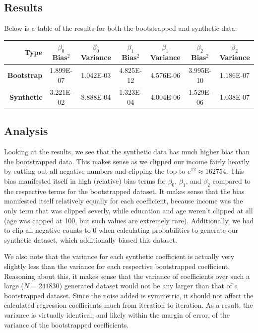 \documentclass[12pt]{article}
\begin{document}
\subsection{Results}

\noindent

Below is a table of the results for both the bootstrapped and synthetic data:

\begin{table}[h]
\begin{tabular}{|r|c|c|c|c|c|c|}
\hline
{\textbf{Type}} & $\beta_0$ Bias$^2$ & $\beta_0$ Variance & $\beta_1$ Bias$^2$ & $\beta_1$ Variance & $\beta_2$ Bias$^2$ & $\beta_2$ Variance \\ \hline
\textbf{Bootstrap} & 1.899E-07  & 1.042E-03 & 4.825E-12 & 4.576E-06 & 3.995E-10 & 1.186E-07 \\ \hline
\textbf{Synthetic} & 3.221E-02 & 8.888E-04 & 1.323E-04 & 4.004E-06 & 1.529E-06 & 1.038E-07 \\ \hline
\end{tabular}
\end{table}

\subsection{Analysis}

\noindent

Looking at the results, we see that the synthetic data has much higher bias than the bootstrapped data. This makes sense as we clipped our income fairly heavily by cutting out all negative numbers and clipping the top to $e^{12} \approx 162754$. This bias manifested itself in high (relative) bias terms for $\beta_0$, $\beta_1$, and $\beta_2$ compared to the respective terms for the bootstrapped dataset. It makes sense that the bias manifested itself relatively equally for each coefficient, because income was the only term that was clipped severly, while education and age weren't clipped at all (age was capped at 100, but such values are extremely rare). Additionally, we had to clip all negative counts to 0 when calculating probabilities to generate our synthetic dataset, which additionally biased this dataset.

\medskip

We also note that the variance for each synthetic coefficient is actually very slightly less than the variance for each respective bootstrapped coefficient. Reasoning about this, it makes sense that the variance of coefficients over such a large ($N = 241830$) generated dataset would not be any larger than that of a bootstrapped dataset. Since the noise added is symmetric, it should not affect the calculated regression coefficients much from iteration to iteration. As a result, the variance is virtually identical, and likely within the margin of error, of the variance of the bootstrapped coefficients.
\end{document}
